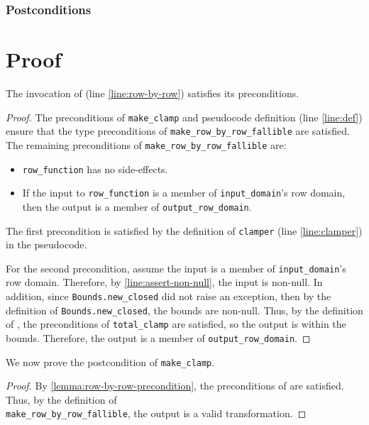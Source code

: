 \documentclass{article}
\begin{document}
\subsubsection*{Postconditions}

\section{Proof}

\begin{lemma}
    The invocation of  (line \ref{line:row-by-row}) satisfies its preconditions.
\end{lemma}

\begin{proof}
    \label{lemma:row-by-row-precondition}
    The preconditions of \texttt{make\_clamp} and pseudocode definition (line \ref{line:def}) ensure that the type preconditions of \texttt{make\_row\_by\_row\_fallible} are satisfied. 
    The remaining preconditions of \texttt{make\_row\_by\_row\_fallible} are:
    \begin{itemize}
        \item \texttt{row\_function} has no side-effects.
        \item If the input to \texttt{row\_function} is a member of \texttt{input\_domain}'s row domain, then the output is a member of \texttt{output\_row\_domain}.
    \end{itemize}

    The first precondition is satisfied by the definition of \texttt{clamper} (line \ref{line:clamper}) in the pseudocode.

    For the second precondition, assume the input is a member of \texttt{input\_domain}'s row domain. 
    Therefore, by \ref{line:assert-non-null}, the input is non-null.
    In addition, since \texttt{Bounds.new\_closed} did not raise an exception, then by the definition of \texttt{Bounds.new\_closed}, the bounds are non-null.
    Thus, by the definition of , the preconditions of \texttt{total\_clamp} are satisfied, so the output is within the bounds.
    Therefore, the output is a member of \texttt{output\_row\_domain}.
\end{proof}

We now prove the postcondition of \texttt{make\_clamp}.
\begin{proof}
By \ref{lemma:row-by-row-precondition}, the preconditions of  are satisfied.
Thus, by the definition of \\\texttt{make\_row\_by\_row\_fallible}, the output is a valid transformation.
\end{proof}
\end{document}
